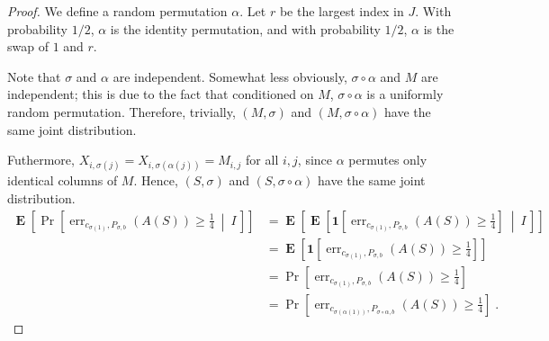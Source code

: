 \documentclass[10pt]{article}
\newcommand{\indicator}[1]{\mathbf{1}\left[{#1}\right]}
\DeclareMathOperator{\err}{err}
\DeclareMathOperator{\Exp}{\mathbf{E}}
\begin{document}
\begin{proof}
We define a random permutation $\alpha$. Let $r$ be the largest index in
$J$. With probability $1/2$, $\alpha$ is the identity permutation, and with
probability $1/2$, $\alpha$ is the swap of $1$ and $r$.

Note that $\sigma$ and $\alpha$ are independent. Somewhat less
obviously, $\sigma \circ \alpha$ and $M$ are independent; this is due to the
fact that conditioned on $M$, $\sigma \circ \alpha$ is a uniformly random
permutation. Therefore, trivially, $(M,\sigma)$ and $(M, \sigma \circ \alpha)$
have the same joint distribution.

Futhermore, $X_{i,\sigma(j)} = X_{i,\sigma(\alpha(j))} = M_{i,j}$ for all
$i,j$, since $\alpha$ permutes only identical columns of $M$. Hence,
$(S,\sigma)$ and $(S,\sigma \circ \alpha)$ have the same joint distribution.
\begin{align*}
\Exp \left[ \Pr \left[\err_{c_{\sigma(1)},P_{\sigma, b}}(A(S)) \ge \frac{1}{4} \ \middle| \ I \, \right] \right]
& = \Exp \left[ \Exp \left[ \indicator{ \err_{c_{\sigma(1)},P_{\sigma, b}}(A(S)) \ge \frac{1}{4}} \ \middle| \ I \, \right] \right] \\
& = \Exp \left[ \indicator{ \err_{c_{\sigma(1)},P_{\sigma, b}}(A(S)) \ge \frac{1}{4}} \right] \\
& = \Pr \left[ \err_{c_{\sigma(1)},P_{\sigma, b}}(A(S)) \ge \frac{1}{4} \right] \\
& = \Pr \left[ \err_{c_{\sigma(\alpha(1))},P_{\sigma \circ \alpha, b}}(A(S)) \ge \frac{1}{4} \right] \; .
\end{align*}


\end{proof}
\end{document}
